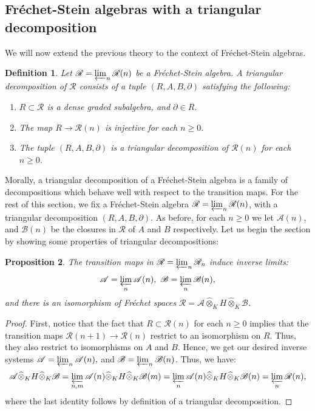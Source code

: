 \documentclass{amsart}
\newtheorem{defi}{ Definition}[subsection]
\newtheorem{prop}[defi]{ Proposition}
\begin{document}
\subsection{Fréchet-Stein algebras with a triangular decomposition}\label{category O for Fréchet-Stein algebras}
We will now extend the previous theory to the context of Fréchet-Stein algebras. 
\begin{defi}
Let $\mathscr{R}=\varprojlim_n\mathscr{R}(n)$ be a Fréchet-Stein algebra. A triangular decomposition of $\mathscr{R}$ consists of a tuple $(R, A,B,\partial)$ satisfying the following:
\begin{enumerate}[label=(\roman*)]
    \item $R\subset \mathscr{R}$ is a dense graded subalgebra, and $\partial \in R$.
    \item The map $R\rightarrow \mathscr{R}(n)$ is injective for each $n\geq 0$.
    \item The tuple $(R,A,B,\partial)$ is a triangular decomposition of $\mathscr{R}(n)$ for each $n\geq 0$.
\end{enumerate}
\end{defi}
Morally, a triangular decomposition of a Fréchet-Stein algebra is a family of decompositions which behave well with respect to the transition maps. For the rest of this section, we fix a  Fréchet-Stein algebra $\mathscr{R}=\varprojlim_n\mathscr{R}(n)$, with a triangular decomposition 
$(R,A,B,\partial)$. As before, for each $n\geq 0$ we let $\mathscr{A}(n)$, and $\mathscr{B}(n)$ be the closures in $\mathscr{R}$ of $A$ and $B$ respectively. Let us begin the section by showing some properties of triangular decompositions:
\begin{prop}\label{prop decomposition as tensor products of Fréchet spaces}
The transition maps in  $\mathscr{R}=\varprojlim_n\mathscr{R}_n$ induce inverse limits:
\begin{equation*}
    \mathscr{A}=\varprojlim_n\mathscr{A}(n), \textnormal{ }\mathscr{B}=\varprojlim_n \mathscr{B}(n),
\end{equation*}
and there is an isomorphism of Fréchet spaces $\mathscr{R}=\mathscr{A}\widehat{\otimes}_KH\widehat{\otimes}_K\mathscr{B}$.
\end{prop}
\begin{proof}
First, notice that the fact that $R\subset \mathscr{R}(n)$ for each $n\geq 0$ implies that the transition maps $\mathscr{R}(n+1)\rightarrow \mathscr{R}(n)$ restrict to an isomorphism on $R$. Thus, they also restrict to isomorphisms on $A$ and  $B$. Hence, we get our desired inverse systems
$\mathscr{A}=\varprojlim_n\mathscr{A}(n),$ and $\mathscr{B}=\varprojlim_n \mathscr{B}(n)$. Thus, we have:
\begin{equation*}
    \mathscr{A}\widehat{\otimes}_KH\widehat{\otimes}_K\mathscr{B}=\varprojlim_{n,m}\mathscr{A}(n)\widehat{\otimes}_KH\widehat{\otimes}_K \mathscr{B}(m)=\varprojlim_{n}\mathscr{A}(n)\widehat{\otimes}_KH\widehat{\otimes}_K \mathscr{B}(n)=\varprojlim_n\mathscr{R}(n),
\end{equation*}
where the last identity follows by definition of a triangular decomposition.
\end{proof}
\end{document}
